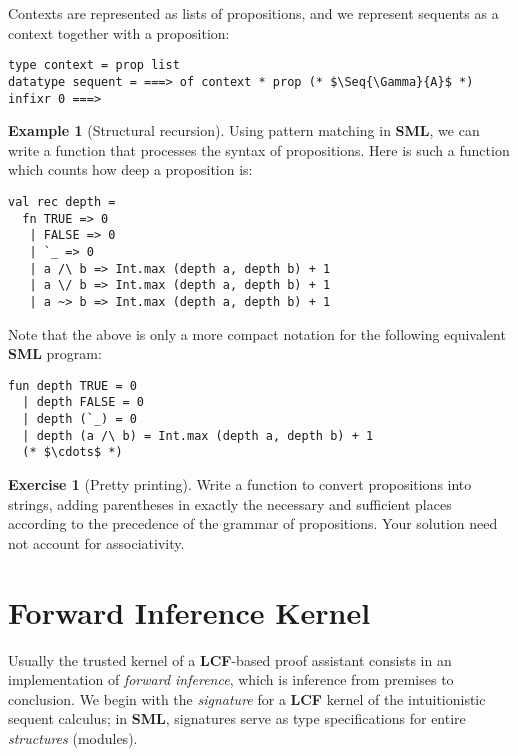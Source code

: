 \documentclass{article}
\newcommand\FormatLang[1]{{\bfseries\sffamily #1}}
\newcommand\SML{\FormatLang{SML}}
\newcommand\LCF{\FormatLang{LCF}}
\newcommand\Seq[2]{{#1}\Longrightarrow{#2}}
\theoremstyle{definition}
\newtheorem{example}{Example}[section]
\newtheorem{exercise}{Exercise}[section]
\theoremstyle{remark}
\begin{document}
Contexts are represented as lists of propositions, and we represent
sequents as a context together with a proposition:

\begin{verbatim}
type context = prop list
datatype sequent = ===> of context * prop (* $\Seq{\Gamma}{A}$ *)
infixr 0 ===>
\end{verbatim}

\begin{example}[Structural recursion]
  Using pattern matching in \SML, we can write a function that
  processes the syntax of propositions. Here is such a function which
  counts how deep a proposition is:
\begin{verbatim}
val rec depth =
  fn TRUE => 0
   | FALSE => 0
   | `_ => 0
   | a /\ b => Int.max (depth a, depth b) + 1
   | a \/ b => Int.max (depth a, depth b) + 1
   | a ~> b => Int.max (depth a, depth b) + 1
\end{verbatim}

  Note that the above is only a more compact notation for the
  following equivalent \SML{} program:
\begin{verbatim}
fun depth TRUE = 0
  | depth FALSE = 0
  | depth (`_) = 0
  | depth (a /\ b) = Int.max (depth a, depth b) + 1
  (* $\cdots$ *)
\end{verbatim}

\end{example}

\begin{exercise}[Pretty printing]
  Write a function to convert propositions into strings, adding
  parentheses in exactly the necessary and sufficient places according
  to the precedence of the grammar of propositions. Your solution need
  not account for associativity.
\end{exercise}


\section{Forward Inference Kernel}

Usually the trusted kernel of a \LCF{}-based proof assistant consists
in an implementation of \emph{forward inference}, which is inference
from premises to conclusion. We begin with the \emph{signature} for a
\LCF{} kernel of the intuitionistic sequent calculus; in \SML{},
signatures serve as type specifications for entire \emph{structures}
(modules).
\end{document}
